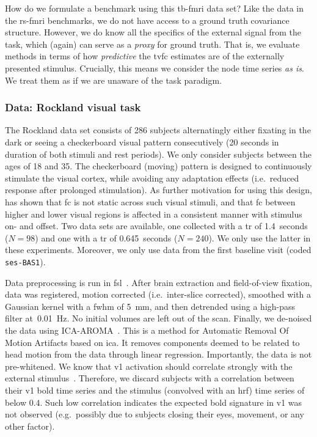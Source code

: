 How do we formulate a benchmark using this \gls{tb-fmri} data set?
Like the data in the \gls{rs-fmri} benchmarks, we do not have access to a ground truth covariance structure.
However, we do know all the specifics of the external signal from the task, which (again) can serve as a \emph{proxy} for ground truth.
That is, we evaluate methods in terms of how \emph{predictive} the \gls{tvfc} estimates are of the externally presented stimulus.
Crucially, this means we consider the node time series \emph{as is}.
We treat them as if we are unaware of the task paradigm.

\subsubsection{Data: Rockland visual task}\label{subsec:rockland-data}

The Rockland data set consists of 286 subjects alternatingly either fixating in the dark or seeing a checkerboard visual pattern consecutively (20 seconds in duration of both stimuli and rest periods).
We only consider subjects between the ages of 18 and 35.
The checkerboard (moving) pattern is designed to continuously stimulate the visual cortex, while avoiding any adaptation effects (i.e.~reduced response after prolonged stimulation).
As further motivation for using this design, \textcite{Di2015} has shown that \gls{fc} is not static across such visual stimuli, and that \gls{fc} between higher and lower visual regions is affected in a consistent manner with stimulus on- and offset.
%
Two data sets are available, one collected with a \gls{tr} of 1.4~seconds ($N = 98$) and one with a \gls{tr} of 0.645~seconds ($N = 240$).
We only use the latter in these experiments.
Moreover, we only use data from the first baseline visit (coded \texttt{ses-BAS1}).

Data preprocessing is run in \gls{fsl}~\parencite{Jenkinson2012}.
After brain extraction and field-of-view fixation, data was registered, motion corrected (i.e.~inter-slice corrected), smoothed with a Gaussian kernel with a \gls{fwhm} of 5~mm, and then detrended using a high-pass filter at~0.01~Hz.
No initial volumes are left out of the scan.
Finally, we de-noised the data using ICA-AROMA~\parencite{Pruim2015a, Pruim2015b}.
This is a method for Automatic Removal Of Motion Artifacts based on \gls{ica}.
It removes components deemed to be related to head motion from the data through linear regression.
Importantly, the data is not pre-whitened.
%
We know that \gls{v1} activation should correlate strongly with the external stimulus~\parencite{Sahib2018}.
Therefore, we discard subjects with a correlation between their \gls{v1} \gls{bold} time series and the stimulus (convolved with an \gls{hrf}) time series of below 0.4.
Such low correlation indicates the expected \gls{bold} signature in \gls{v1} was not observed (e.g.~possibly due to subjects closing their eyes, movement, or any other factor).

